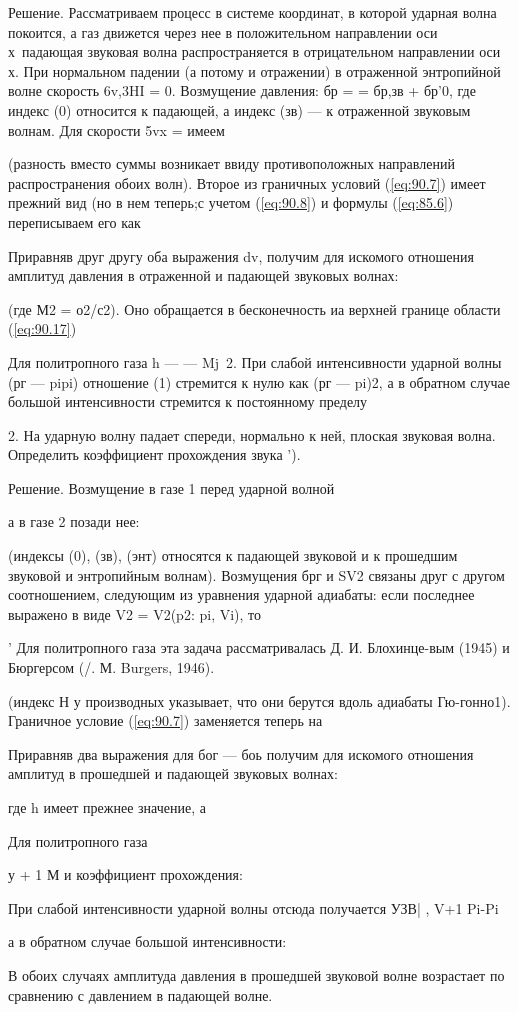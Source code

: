 Решение. Рассматриваем процесс в системе координат, в которой ударная волна
покоится, а газ движется через нее в положительном направлении оси х\ падающая
звуковая волна распространяется в отрицательном направлении оси х. При
нормальном падении (а потому и отражении) в отраженной энтропийной волне
скорость 6v,3HI = 0. Возмущение давления: бр = = бр,зв + бр'0, где индекс
(0) относится к падающей, а индекс (зв) — к отраженной звуковым волнам. Для
скорости 5vx = имеем


(разность вместо суммы возникает ввиду противоположных направлений
распространения обоих волн). Второе из граничных условий (\ref{eq:90.7}) имеет
прежний вид (но в нем теперь;с учетом (\ref{eq:90.8}) и формулы (\ref{eq:85.6})
переписываем его как


Приравняв друг другу оба выражения dv, получим для искомого отношения амплитуд
давления в отраженной и падающей звуковых волнах:

(где М2 = о2/с2). Оно обращается в бесконечность иа верхней границе области
(\ref{eq:90.17})

Для политропного газа h — — Mj~2. При слабой интенсивности ударной волны (рг —
pipi) отношение (1) стремится к нулю как (рг — pi)2, а в обратном случае
большой интенсивности стремится к постоянному пределу


2. На ударную волну падает спереди, нормально к ней, плоская звуковая волна.
Определить коэффициент прохождения звука ').

Решение. Возмущение в газе 1 перед ударной волной



а в газе 2 позади нее:

(индексы (0), (зв), (энт) относятся к падающей звуковой и к прошедшим звуковой
и энтропийным волнам). Возмущения брг и SV2 связаны друг с другом соотношением,
следующим из уравнения ударной адиабаты: если последнее выражено в виде V2 =
V2(p2: pi, Vi), то


' Для политропного газа эта задача рассматривалась Д. И. Блохинце-вым (1945) и
Бюргерсом (/. М. Burgers, 1946).


(индекс Н у производных указывает, что они берутся вдоль адиабаты Гю-гонно1).
Граничное условие (\ref{eq:90.7}) заменяется теперь на

Приравняв два выражения для бог — боь получим для искомого отношения амплитуд в
прошедшей и падающей звуковых волнах:

где h имеет прежнее значение, а


Для политропного газа


у + 1 М и коэффициент прохождения:


При слабой интенсивности ударной волны отсюда получается УЗВ| , V+1 Pi-Pi

а в обратном случае большой интенсивности:


В обоих случаях амплитуда давления в прошедшей звуковой волне возрастает по
сравнению с давлением в падающей волне.

